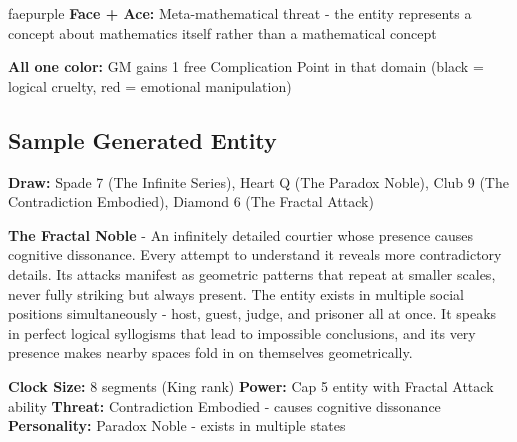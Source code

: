 \documentclass[11pt]{article}
\begin{document}
\begin{campaignsection}{faepurple}
\textbf{Face + Ace:} Meta-mathematical threat - the entity represents a concept about mathematics itself rather than a mathematical concept

\textbf{All one color:} GM gains 1 free Complication Point in that domain (black = logical cruelty, red = emotional manipulation)

\subsection*{Sample Generated Entity}

\textbf{Draw:} Spade 7 (The Infinite Series), Heart Q (The Paradox Noble), Club 9 (The Contradiction Embodied), Diamond 6 (The Fractal Attack)

\textbf{The Fractal Noble} - An infinitely detailed courtier whose presence causes cognitive dissonance. Every attempt to understand it reveals more contradictory details. Its attacks manifest as geometric patterns that repeat at smaller scales, never fully striking but always present. The entity exists in multiple social positions simultaneously - host, guest, judge, and prisoner all at once. It speaks in perfect logical syllogisms that lead to impossible conclusions, and its very presence makes nearby spaces fold in on themselves geometrically.

\textbf{Clock Size:} 8 segments (King rank)
\textbf{Power:} Cap 5 entity with Fractal Attack ability
\textbf{Threat:} Contradiction Embodied - causes cognitive dissonance
\textbf{Personality:} Paradox Noble - exists in multiple states
\end{campaignsection}

\newpage
\end{document}
